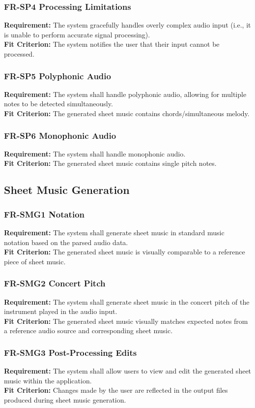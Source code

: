 \documentclass[12pt]{article}
\begin{document}
\subsubsection*{FR-SP4 Processing Limitations}
\textbf{Requirement:} The system gracefully handles overly complex audio input (i.e., it is unable to perform accurate signal processing). \\
\textbf{Fit Criterion:} The system notifies the user that their input cannot be processed.
\subsubsection*{FR-SP5 Polyphonic Audio}
\textbf{Requirement:} The system shall handle polyphonic audio, allowing for multiple notes to be detected simultaneously. \\
\textbf{Fit Criterion:} The generated sheet music contains chords/simultaneous melody.
\subsubsection*{FR-SP6 Monophonic Audio}
\textbf{Requirement:} The system shall handle monophonic audio. \\
\textbf{Fit Criterion:} The generated sheet music contains single pitch notes.

\subsection{Sheet Music Generation}
\subsubsection*{FR-SMG1 Notation}
\textbf{Requirement:} The system shall generate sheet music in standard music notation based on the parsed audio data. \\
\textbf{Fit Criterion:} The generated sheet music is visually comparable to a reference piece of sheet music.
\subsubsection*{FR-SMG2 Concert Pitch}
\textbf{Requirement:} The system shall generate sheet music in the concert pitch of the instrument played in the audio input. \\
\textbf{Fit Criterion:} The generated sheet music visually matches expected notes from a reference audio source and corresponding sheet music.
\subsubsection*{FR-SMG3 Post-Processing Edits}
\textbf{Requirement:} The system shall allow users to view and edit the generated sheet music within the application. \\
\textbf{Fit Criterion:} Changes made by the user are reflected in the output files produced during sheet music generation.
\end{document}
